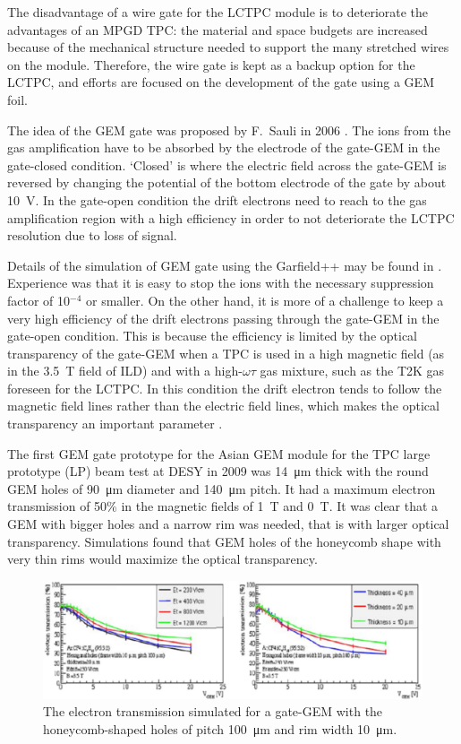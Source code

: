 The disadvantage of a wire gate for the LCTPC module is to deteriorate the advantages of an MPGD TPC:
the material and space budgets are increased because of the mechanical structure needed to support the many
stretched wires on the module. Therefore, the wire gate is kept as a backup option for the LCTPC, and efforts
are focused on the development of the gate using a GEM foil.

The idea of the GEM gate was proposed by F.~Sauli in 2006 \cite{Sauli2006269}.
The ions from the gas amplification have to be absorbed by the electrode of the gate-GEM in the gate-closed condition.
`Closed' is where the electric field across the gate-GEM is reversed by changing the potential of the bottom
electrode of the gate by about \SI{10}{V}. In the gate-open condition the drift electrons need to reach
to the gas amplification region with a high efficiency in order to not deteriorate the LCTPC resolution
due to loss of signal.

Details of the simulation of GEM gate using the Garfield++ may be found in \cite{LC-DET-2012-079}. Experience was that it is easy
to stop the ions with the necessary suppression factor of 10$^{-4}$ or smaller. On the other hand, it is more
of a challenge to keep a very high efficiency of the drift electrons passing through the gate-GEM in the gate-open
condition. This is because the efficiency is limited by the optical transparency of the gate-GEM when a TPC
is used in a high magnetic field (as in the \SI{3.5}{T} field of ILD) and with a high-$\omega\tau$ gas mixture,
such as the T2K gas \cite{Behnke:2013lya,ref4T2Kgas_ishikawa,Kobayashi201137,Kobayashi2013122} foreseen for the LCTPC. In this condition the drift electron tends to follow the
magnetic field lines rather than the electric field lines, which makes the optical transparency an important parameter .

The first GEM gate prototype for the Asian GEM module for the TPC large prototype (LP) beam test at
DESY in 2009 was \SI{14}{\micro m} thick with the round GEM holes of
\SI{90}{\micro m} diameter and \SI{140}{\micro m} pitch. It had a maximum electron
transmission of 50\% in the magnetic fields of \SI{1}{T} and \SI{0}{T}. It was clear that a GEM
with bigger holes and a narrow rim was needed, that is with larger optical transparency. Simulations found that
GEM holes of the honeycomb shape with very thin rims would maximize the optical transparency.

\begin{figure}
\begin{center}
\includegraphics[width=.7\textwidth]{Tracker/TPC_Bonn/plots/TPC-Gate_Fig3gating.pdf}%
\caption{\label{Fig3gating} {The electron transmission simulated for a gate-GEM with the honeycomb-shaped holes of pitch \SI{100}{\micro m} and rim width \SI{10}{\micro m}.}}
\end{center}
\end{figure}

